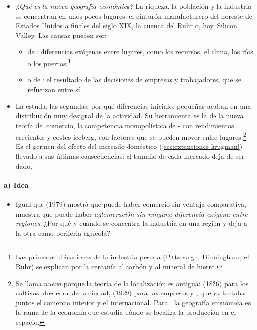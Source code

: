 \documentclass[11pt]{article}
\begin{document}
\begin{itemize}
\item \emph{¿Qué es la nueva geografía económica?} La riqueza, la población y la industria se concentran en unos pocos lugares: el cinturón manufacturero del noreste de Estados Unidos a finales del siglo XIX, la cuenca del Ruhr o, hoy, Silicon Valley. Las causas pueden ser:
  \begin{itemize}
  \item de : diferencias exógenas entre lugares, como los recursos, el clima, los ríos o los puertos;\footnote{Las primeras ubicaciones de la industria pesada (Pittsburgh, Birmingham, el Ruhr) se explican por la cercanía al carbón y al mineral de hierro.}
  \item o de : el resultado de las decisiones de empresas y trabajadores, que se refuerzan entre sí.
  \end{itemize}
\item La \nocite{Fujita1988Monopolistic,Krugman1991Increasing,Venables1996Equilibrium} estudia las segundas: por qué diferencias iniciales pequeñas acaban en una distribución muy desigual de la actividad. Su herramienta es la de la nueva teoría del comercio, la competencia monopolística de - con rendimientos crecientes y costes iceberg, con factores que se pueden mover entre lugares\nocite{FujitaKrugmanVenables1999Spatial}.\footnote{Se llama \emph{nueva} porque la teoría de la localización es antigua:  (1826) para los cultivos alrededor de la ciudad,  (1929) para las empresas  y \textcite{Ohlin1933Interregional}, que ya trataba juntos el comercio interior y el internacional. Para \textcite{Krugman1991Geography}, la geografía económica es la rama de la economía que estudia dónde se localiza la producción en el espacio.} Es el germen del efecto del mercado doméstico (\ref{sec:extensiones-krugman}) llevado a sus últimas consecuencias: el tamaño de cada mercado deja de ser dado.
\end{itemize}

\paragraph{a) Idea}

\begin{itemize}
\item Igual que  (1979) mostró que puede haber comercio sin ventaja comparativa, \textcite{Krugman1991Increasing} muestra que puede haber \emph{aglomeración sin ninguna diferencia exógena entre regiones}. ¿Por qué y cuándo se concentra la industria en una región y deja a la otra como periferia agrícola?
\end{itemize}
\end{document}
